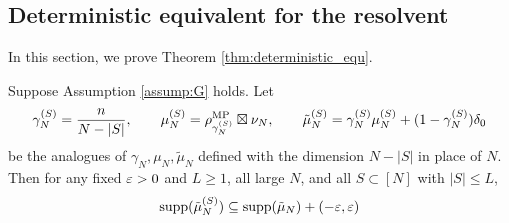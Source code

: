 \subsection{Deterministic equivalent for the
resolvent}\label{sec:deterministicequiv}

In this section, we prove Theorem \ref{thm:deterministic_equ}. 

\begin{lemma}\label{lemma:supportcomparea}
Suppose Assumption \ref{assump:G} holds. Let
\[\gamma_N^{(S)}=\frac{n}{N-|S|}, \qquad
\mu_N^{(S)}=\rho_{\gamma_N^{(S)}}^{\textnormal{MP}} \boxtimes \nu_N, \qquad
\tilde \mu_N^{(S)}=\gamma_N^{(S)} \mu_N^{(S)}+(1-\gamma_N^{(S)})\delta_0\]
be the analogues of $\gamma_N,\mu_N,\tilde \mu_N$ defined with the dimension
$N-|S|$ in place of $N$.
Then for any fixed $\varepsilon>0$ and $L \geq 1$, all large $N$, and all
$S \subset [N]$ with $|S| \leq L$,
\[\mathrm{supp}({\tilde \mu_N^{(S)}}) \subseteq \mathrm{supp}({\tilde \mu_N})+(-\varepsilon,\varepsilon)\]
\end{lemma}
